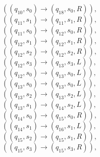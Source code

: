 \documentclass{article} %
\begin{document}
\begin{center}
\begin{varwidth}{\textwidth}
\begin{tasks}[label={},label-width={1cm}]
            $((q_{10}, s_{0}) \to ( q_{18}, s_{0}, R)),$\\
            $((q_{11}, s_{1}) \to ( q_{11}, s_{1}, R)),$\\
            $((q_{11}, s_{0}) \to ( q_{12}, s_{0}, R)),$\\
            $((q_{12}, s_{1}) \to ( q_{12}, s_{1}, R)),$\\
            $((q_{12}, s_{2}) \to ( q_{12}, s_{2}, R)),$\\
            $((q_{12}, s_{3}) \to ( q_{13}, s_{3}, L)),$\\
            $((q_{12}, s_{0}) \to ( q_{13}, s_{0}, L)),$\\
            $((q_{13}, s_{0}) \to ( q_{13}, s_{0}, L)),$\\
            $((q_{13}, s_{2}) \to ( q_{13}, s_{2}, L)),$\\
            $((q_{13}, s_{1}) \to ( q_{14}, s_{2}, L)),$\\
            $((q_{14}, s_{0}) \to ( q_{15}, s_{0}, R)),$\\
            $((q_{14}, s_{1}) \to ( q_{16}, s_{1}, L)),$\\
            $((q_{15}, s_{2}) \to ( q_{15}, s_{1}, R)),$\\
            $((q_{15}, s_{3}) \to ( q_{15}, s_{3}, R)),$\\


\end{tasks}
\end{varwidth}
\end{center}
\end{document}
